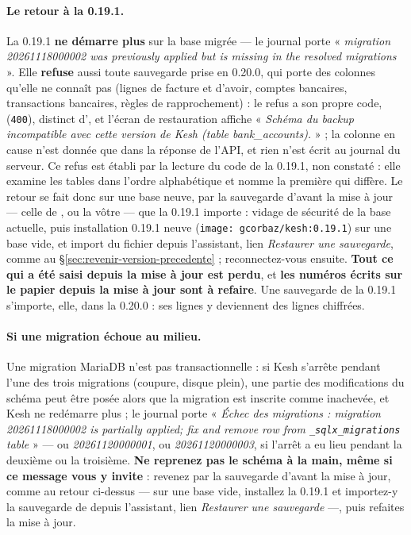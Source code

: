 \documentclass[a4paper,11pt,oneside]{article}
\begin{document}
\paragraph{Le retour à la 0.19.1.} La 0.19.1 \textbf{ne démarre plus} sur la base migrée --- le journal porte « \emph{migration 20261118000002 was previously applied but is missing in the resolved migrations} ». Elle \textbf{refuse} aussi toute sauvegarde prise en 0.20.0, qui porte des colonnes qu'elle ne connaît pas (lignes de facture et d'avoir, comptes bancaires, transactions bancaires, règles de rapprochement) : le refus a son propre code,  (\texttt{400}), distinct d', et l'écran de restauration affiche « \emph{Schéma du backup incompatible avec cette version de Kesh (table bank\_accounts).} » ; la colonne en cause n'est donnée que dans la réponse de l'API, et rien n'est écrit au journal du serveur. Ce refus est établi par la lecture du code de la 0.19.1, non constaté : elle examine les tables dans l'ordre alphabétique et nomme la première qui diffère. Le retour se fait donc sur une base neuve, par la sauvegarde d'avant la mise à jour --- celle de , ou la vôtre --- que la 0.19.1 importe : vidage de sécurité de la base actuelle, puis installation 0.19.1 neuve (\texttt{image: gcorbaz/kesh:0.19.1}) sur une base vide, et import du fichier depuis l'assistant, lien \emph{Restaurer une sauvegarde}, comme au \S\ref{sec:revenir-version-precedente} ; reconnectez-vous ensuite. \textbf{Tout ce qui a été saisi depuis la mise à jour est perdu}, et \textbf{les numéros écrits sur le papier depuis la mise à jour sont à refaire}. Une sauvegarde de la 0.19.1 s'importe, elle, dans la 0.20.0 : ses lignes y deviennent des lignes chiffrées.

\paragraph{Si une migration échoue au milieu.} Une migration MariaDB n'est pas transactionnelle : si Kesh s'arrête pendant l'une des trois migrations (coupure, disque plein), une partie des modifications du schéma peut être posée alors que la migration est inscrite comme inachevée, et Kesh ne redémarre plus ; le journal porte « \emph{Échec des migrations : migration 20261118000002 is partially applied; fix and remove row from \texttt{\textasciigrave\_sqlx\_migrations\textasciigrave} table} » --- ou \emph{20261120000001}, ou \emph{20261120000003}, si l'arrêt a eu lieu pendant la deuxième ou la troisième. \textbf{Ne reprenez pas le schéma à la main, même si ce message vous y invite} : revenez par la sauvegarde d'avant la mise à jour, comme au retour ci-dessus --- sur une base vide, installez la 0.19.1 et importez-y la sauvegarde de  depuis l'assistant, lien \emph{Restaurer une sauvegarde} ---, puis refaites la mise à jour.
\end{document}
